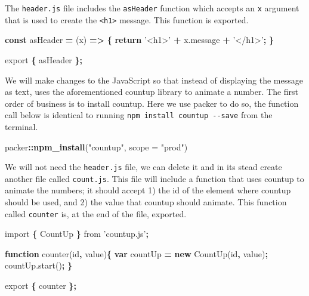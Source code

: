 \documentclass[10pt,]{krantz}
\makeatletter
\newenvironment{Shaded}{\begin{snugshade}}{\end{snugshade}}
\newcommand{\AttributeTok}[1]{\textcolor[rgb]{0.61,0.61,0.61}{#1}}
\newcommand{\ControlFlowTok}[1]{\textcolor[rgb]{0.27,0.27,0.27}{\textbf{#1}}}
\newcommand{\DataTypeTok}[1]{\textcolor[rgb]{0.27,0.27,0.27}{#1}}
\newcommand{\ImportTok}[1]{#1}
\newcommand{\KeywordTok}[1]{\textcolor[rgb]{0.27,0.27,0.27}{\textbf{#1}}}
\newcommand{\NormalTok}[1]{#1}
\newcommand{\OperatorTok}[1]{\textcolor[rgb]{0.43,0.43,0.43}{\textbf{#1}}}
\newcommand{\StringTok}[1]{\textcolor[rgb]{0.5,0.5,0.5}{#1}}
\newcommand{\VariableTok}[1]{\textcolor[rgb]{0,0,0}{#1}}
\newenvironment{kframe}{%
\medskip{}
\setlength{\fboxsep}{.8em}
 \def\at@end@of@kframe{}%
 \ifinner\ifhmode%
  \def\at@end@of@kframe{\end{minipage}}%
  \begin{minipage}{\columnwidth}%
 \fi\fi%
 \def\FrameCommand##1{\hskip\@totalleftmargin \hskip-\fboxsep
 \colorbox{shadecolor}{##1}\hskip-\fboxsep
     \hskip-\linewidth \hskip-\@totalleftmargin \hskip\columnwidth}%
 \MakeFramed {\advance\hsize-\width
   \@totalleftmargin\z@ \linewidth\hsize
   \@setminipage}}%
 {\par\unskip\endMakeFramed%
 \at@end@of@kframe}
\renewenvironment{Shaded}{\begin{kframe}}{\end{kframe}}
\makeatother
\begin{document}
The \texttt{header.js} file includes the \texttt{asHeader} function which accepts an \texttt{x} argument that is used to create the \texttt{\textless{}h1\textgreater{}} message. This function is exported.

\begin{Shaded}
\begin{Highlighting}[]
\KeywordTok{const}\NormalTok{ asHeader }\OperatorTok{=}\NormalTok{ (x) }\KeywordTok{=>} \OperatorTok{\{}
  \ControlFlowTok{return} \StringTok{'<h1>'} \OperatorTok{+} \VariableTok{x}\NormalTok{.}\AttributeTok{message} \OperatorTok{+} \StringTok{'</h1>'}\OperatorTok{;}
\OperatorTok{\}}

\ImportTok{export} \OperatorTok{\{}\NormalTok{ asHeader }\OperatorTok{\};}
\end{Highlighting}
\end{Shaded}

We will make changes to the JavaScript so that instead of displaying the message as text, uses the aforementioned countup library to animate a number. The first order of business is to install countup. Here we use packer to do so, the function call below is identical to running \texttt{npm\ install\ countup\ -\/-save} from the terminal.

\begin{Shaded}
\begin{Highlighting}[]
\NormalTok{packer}\OperatorTok{::}\KeywordTok{npm_install}\NormalTok{(}\StringTok{"countup"}\NormalTok{, }\DataTypeTok{scope =} \StringTok{"prod"}\NormalTok{) }
\end{Highlighting}
\end{Shaded}

We will not need the \texttt{header.js} file, we can delete it and in its stead create another file called \texttt{count.js}. This file will include a function that uses countup to animate the numbers; it should accept 1) the id of the element where countup should be used, and 2) the value that countup should animate. This function called \texttt{counter} is, at the end of the file, exported.

\begin{Shaded}
\begin{Highlighting}[]
\ImportTok{import} \OperatorTok{\{}\NormalTok{ CountUp }\OperatorTok{\}} \ImportTok{from} \StringTok{'countup.js'}\OperatorTok{;}

\KeywordTok{function} \AttributeTok{counter}\NormalTok{(id}\OperatorTok{,}\NormalTok{ value)}\OperatorTok{\{}
  \KeywordTok{var}\NormalTok{ countUp }\OperatorTok{=} \KeywordTok{new} \AttributeTok{CountUp}\NormalTok{(id}\OperatorTok{,}\NormalTok{ value)}\OperatorTok{;}
  \VariableTok{countUp}\NormalTok{.}\AttributeTok{start}\NormalTok{()}\OperatorTok{;}
\OperatorTok{\}}

\ImportTok{export} \OperatorTok{\{}\NormalTok{ counter }\OperatorTok{\};}
\end{Highlighting}
\end{Shaded}
\end{document}
